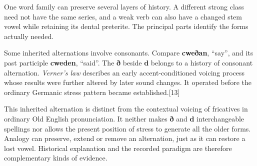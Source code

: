 One word family can preserve several layers of history. A different strong class need not have the same series, and a weak verb can also have a changed stem vowel while retaining its dental preterite. The principal parts identify the forms actually needed.\par
Some inherited alternations involve consonants. Compare \textbf{cweðan}, “say”, and its past participle \textbf{cweden}, “said”. The \textbf{ð} beside \textbf{d} belongs to a history of consonant alternation. \emph{Verner’s law} describes an early accent-conditioned voicing process whose results were further altered by later sound changes. It operated before the ordinary Germanic stress pattern became established.[13]\par
This inherited alternation is distinct from the contextual voicing of fricatives in ordinary Old English pronunciation. It neither makes \textbf{ð} and \textbf{d} interchangeable spellings nor allows the present position of stress to generate all the older forms. Analogy can preserve, extend or remove an alternation, just as it can restore a lost vowel. Historical explanation and the recorded paradigm are therefore complementary kinds of evidence.\par
